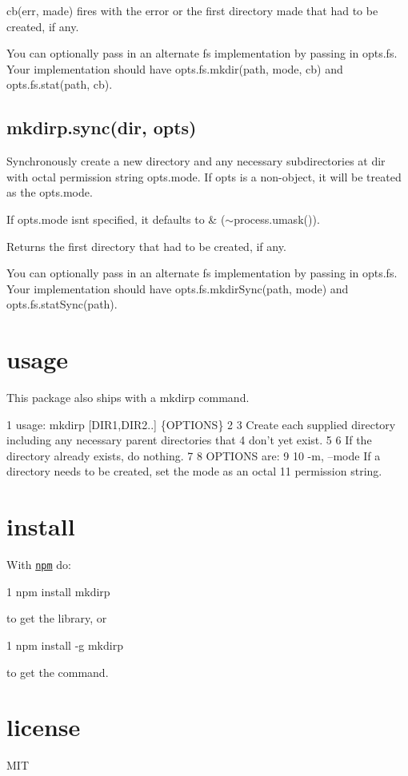{\ttfamily cb(err, made)} fires with the error or the first directory {\ttfamily made} that had to be created, if any.

You can optionally pass in an alternate {\ttfamily fs} implementation by passing in {\ttfamily opts.\+fs}. Your implementation should have {\ttfamily opts.\+fs.\+mkdir(path, mode, cb)} and {\ttfamily opts.\+fs.\+stat(path, cb)}.

\subsection*{mkdirp.\+sync(dir, opts)}

Synchronously create a new directory and any necessary subdirectories at {\ttfamily dir} with octal permission string {\ttfamily opts.\+mode}. If {\ttfamily opts} is a non-\/object, it will be treated as the {\ttfamily opts.\+mode}.

If {\ttfamily opts.\+mode} isn\textquotesingle{}t specified, it defaults to { \& ($\sim$process.umask())}.

Returns the first directory that had to be created, if any.

You can optionally pass in an alternate {\ttfamily fs} implementation by passing in {\ttfamily opts.\+fs}. Your implementation should have {\ttfamily opts.\+fs.\+mkdir\+Sync(path, mode)} and {\ttfamily opts.\+fs.\+stat\+Sync(path)}.

\section*{usage}

This package also ships with a {\ttfamily mkdirp} command.


\begin{DoxyCode}
1 usage: mkdirp [DIR1,DIR2..] \{OPTIONS\}
2 
3   Create each supplied directory including any necessary parent directories that
4   don't yet exist.
5 
6   If the directory already exists, do nothing.
7 
8 OPTIONS are:
9 
10   -m, --mode   If a directory needs to be created, set the mode as an octal
11                permission string.
\end{DoxyCode}


\section*{install}

With \href{http://npmjs.org}{\tt npm} do\+:


\begin{DoxyCode}
1 npm install mkdirp
\end{DoxyCode}


to get the library, or


\begin{DoxyCode}
1 npm install -g mkdirp
\end{DoxyCode}


to get the command.

\section*{license}

M\+I\+T 